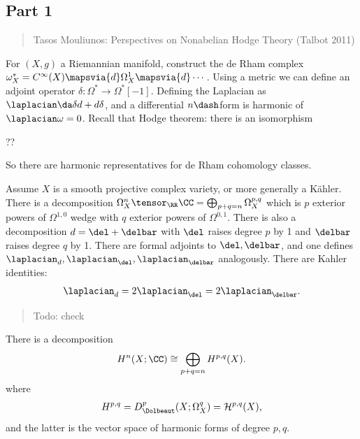 \hypertarget{part-1}{%
\subsection{Part 1}\label{part-1}}

\begin{quote}
Tasos Mouliunos: Perspectives on Nonabelian Hodge Theory (Talbot 2011)
\end{quote}

For \((X, g)\) a Riemannian manifold, construct the de Rham complex
\(\omega^*_X = C^\infty(X) \mapsvia{d} \Omega^1_X \mapsvia{d} \cdots\).
Using a metric we can define an adjoint operator
\(\delta: \Omega^* \to \Omega^*[-1]\). Defining the Laplacian as
\(\laplacian \da \delta d + d\delta\), and a differential \(n\dash\)form
is harmonic of \(\laplacian \omega= 0\). Recall that Hodge theorem:
there is an isomorphism

??

So there are harmonic representatives for de Rham cohomology classes.

Assume \(X\) is a smooth projective complex variety, or more generally a
Kähler. There is a decomposition
\(\Omega_X^n \tensor_\RR \CC = \bigoplus _{p+q=n} \Omega^{p, q}_X\)
which is \(p\) exterior powers of \(\Omega^{1, 0}\) wedge with \(q\)
exterior powers of \(\Omega^{0, 1}\). There is also a decomposition
\(d = \del + \delbar\) with \(\del\) raises degree \(p\) by 1 and
\(\delbar\) raises degree \(q\) by 1. There are formal adjoints to
\(\del, \delbar\), and one defines
\(\laplacian_d, \laplacian_{\del}, \laplacian_{\delbar}\) analogously.
There are Kahler identities:
\begin{align*}
\laplacian_d = 2 \laplacian_{\del} = 2\laplacian_{\delbar}
.\end{align*}

\begin{quote}
Todo: check
\end{quote}

\begin{theorem}[?]

There is a decomposition
\begin{align*}
H^n(X; \CC) \cong \bigoplus _{p+q = n} H^{p, q}(X)
.\end{align*}
where
\begin{align*}
H^{p, q} = D^p_{\Dolbeaut}(X; \Omega_X^q) = \mathcal{H}^{p, q}(X)
,\end{align*}
and the latter is the vector space of harmonic forms of degree \(p, q\).

\end{theorem}

